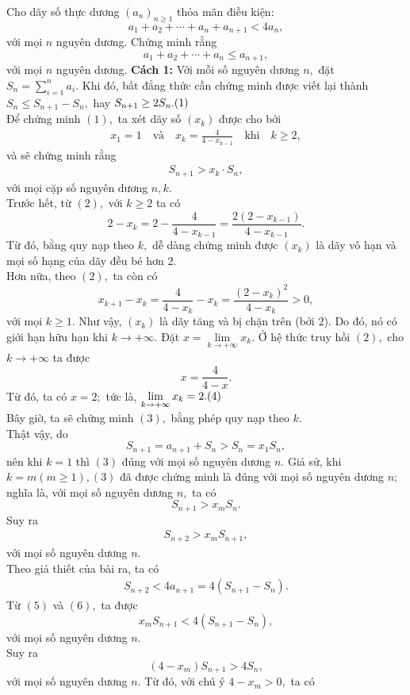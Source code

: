 \begin{bt}%
	Cho dãy số thực dương $(a_n)_{n\geq 1}$ thỏa mãn điều kiện:
	$$ a_1+a_2+\dotsb+a_n+a_{n+1}<4a_n, $$ với mọi $n$ nguyên dương. Chứng minh rằng 
	$$ a_1+a_2+\dotsb+a_n \leq a_{n+1}, $$ với mọi $n$ nguyên dương.
	\loigiai
	{
		\textbf{Cách 1:} 
		Với mỗi số nguyên dương $n,$ đặt $S_n=\sum\limits_{i=1}^n a_i.$ Khi đó, bất đẳng thức cần chứng minh được viết lại thành $S_n \leq S_{n+1}-S_n,$ hay $S_{n+1} \geq 2S_n. \hfill (1)$\\
		Để chứng minh $(1),$ ta xét dãy số $(x_k)$ được cho bởi 
		\begin{align*} x_1=1 \quad \text{và} \quad x_k=\frac{4}{4-x_{k-1}}\quad \text{khi} \quad k\geq 2, \tag{2} \end{align*}  và sẽ chứng minh rằng \begin{align*}S_{n+1}>x_k\cdot S_n, \tag{3} \end{align*} với mọi cặp số nguyên dương $n, k.$\\
		Trước hết, từ $(2),$ với $k\geq 2$ ta có
		$$ 2-x_k=2-\frac{4}{4-x_{k-1}}=\frac{2(2-x_{k-1})}{4-x_{k-1}}.$$  Từ đó, bằng quy nạp theo $k,$ dễ dàng chứng minh được $(x_k)$ là dãy vô hạn và mọi số hạng của dãy đều bé hơn $2.$\\
		Hơn nữa, theo $(2),$ ta còn có
		$$ x_{k+1}-x_k=\frac{4}{4-x_k}-x_k =\frac{(2-x_k)^2}{4-x_k}>0,$$ với mọi $k\geq 1.$ Như vậy, $(x_k)$ là dãy tăng và bị chặn trên (bởi $2$). Do đó, nó có giới hạn hữu hạn khi $k\to +\infty.$ Đặt $x=\lim\limits_{k\to +\infty} x_k.$ Ở hệ thức truy hồi $(2),$ cho  $k\to +\infty$ ta được  
		$$ x=\frac{4}{4-x}. $$ Từ đó, ta có $x=2;$ tức là, $\lim\limits_{k\to +\infty} x_k=2. \hfill (4)$\\
		Bây giờ, ta sẽ chứng minh $(3),$ bằng phép quy nạp theo $k.$\\
		Thật vậy, do $$ S_{n+1}=a_{n+1}+S_n>S_n=x_1S_n, $$ nên khi $k=1$ thì $(3)$ đúng với mọi số nguyên dương $n.$ Giả sử, khi $k=m (m\geq 1), (3)$ đã được chứng minh là đúng với mọi số nguyên dương $n;$ nghĩa là, với mọi số nguyên dương $n,$ ta có
		$$ S_{n+1}>x_mS_n. $$ Suy ra \begin{align*} S_{n+2}>x_mS_{n+1},\tag{5}\end{align*}  với mọi số nguyên dương $n.$\\
		Theo giả thiết của bài ra, ta có
		\begin{align*} S_{n+2}<4a_{n+1}=4(S_{n+1}-S_n).\tag{6} \end{align*}
		Từ $(5)$ và $(6),$ ta được  $$ x_mS_{n+1}<4(S_{n+1}-S_n) ,$$ với mọi số nguyên dương $n.$\\ Suy ra $$ (4-x_m)S_{n+1}>4S_n, $$ với mọi số nguyên dương $n.$ Từ đó, với chú ý $4-x_m>0,$ ta có
}
\end{bt}
